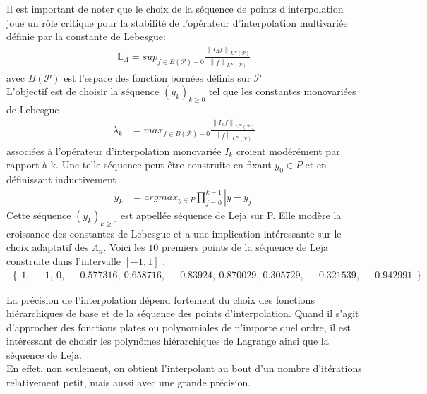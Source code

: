 \vspace{0.5cm}

Il est important de noter que le choix de la séquence de points d'interpolation joue un rôle critique
pour la stabilité de l'opérateur d'interpolation multivariée définie par la constante de Lebesgue:
\begin{align}
		\mathbb{L}_{\Lambda} = sup_{f \in B(\mathcal{P})-{0}} \frac{\left \| I_{\Lambda}f \right \|_{L^{\infty}(\mathcal{P})}}{\left \|f \right \|_{L^{\infty}(\mathcal{P})}}
\end{align}
avec $B(\mathcal{P})$ est l'espace des fonction bornées définis sur $\mathcal{P}$\\
L'objectif est de choisir la séquence $(y_k)_{k \geq 0}$ tel que les constantes monovariées de Lebesgue
\begin{align}
		\lambda_k & = max_{f \in B(\mathcal{P})-{0}} \frac{\left \| I_k f \right \|_{L^{\infty}(\mathcal{P})}}{\left \|f \right \|_{L^{\infty}(\mathcal{P})}}
\end{align}
associées à l'opérateur d'interpolation monovariée $I_k$ croient modérément par rapport à k.
Une telle séquence peut être construite en fixant $y_0 \in P$ et en définissant inductivement
\begin{align}
		y_k & = argmax_{y \in P} \prod_{j=0}^{k-1} \left | y - y_j \right |
\end{align}
Cette séquence $(y_k)_{k \geq 0}$ est appellée séquence de Leja \cite{Leja} sur P. Elle modère la croissance des constantes de Lebesgue
et a une implication intéressante sur le choix adaptatif des $\Lambda_n$. Voici les $10$ premiers points de la séquence de Leja construite dans l'intervalle $\left [ -1, 1 \right ]$ :
\begin{align}
\left \{\ 1,\ -1,\ 0,\ -0.577316,\ 0.658716,\ -0.83924,\ 0.870029,\ 0.305729,\ -0.321539,\ -0.942991\ \right \} \nonumber
\end{align}

\hspace{0.5cm}La précision de l'interpolation dépend fortement du choix des fonctions hiérarchiques de base et de la séquence des points d'interpolation.
Quand il s'agit d'approcher des fonctions plates ou polynomiales de n'importe quel ordre, il est intéressant de choisir les polynômes hiérarchiques de Lagrange ainsi que la séquence de Leja.\\
En effet, non seulement, on obtient l'interpolant au bout d'un nombre d'itérations relativement petit, mais aussi avec une grande précision.

